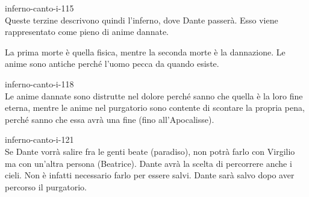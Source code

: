\documentclass[preview]{standalone}
\begin{document}
\begin{snippet}{inferno-canto-i-115}
    \\
    Queste terzine descrivono quindi l'inferno, dove Dante passerà.
    Esso viene rappresentato come pieno di anime dannate.
    
    La prima morte è quella fisica, mentre la seconda morte è la dannazione.
    Le anime sono antiche perché l'uomo pecca da quando esiste.
\end{snippet}

\begin{snippet}{inferno-canto-i-118}
    \\
    Le anime dannate sono distrutte nel dolore perché sanno che quella è la loro
    fine eterna, mentre le anime nel purgatorio sono contente di scontare la propria pena,
    perché sanno che essa avrà una fine (fino all'Apocalisse).

\end{snippet}    


\begin{snippet}{inferno-canto-i-121}
    \\
    Se Dante vorrà salire fra le genti beate (paradiso), non potrà farlo con Virgilio
    ma con un'altra persona (Beatrice).
    Dante avrà la scelta di percorrere anche i cieli. Non è infatti necessario
    farlo per essere salvi. Dante sarà salvo dopo aver percorso il purgatorio.
\end{snippet}
\end{document}
